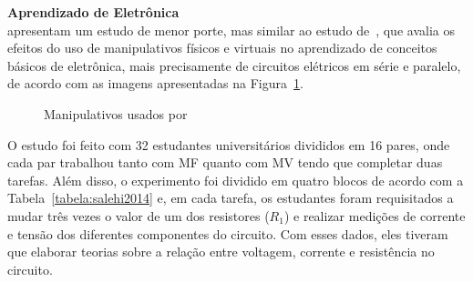 \textbf{Aprendizado de Eletrônica}\\
\cite{Salehi:2014} apresentam um estudo de menor porte, mas similar ao estudo de~\cite{zacharia:2011}, que avalia os efeitos do uso de manipulativos físicos e virtuais no aprendizado de conceitos básicos de eletrônica, mais precisamente de circuitos elétricos em série e paralelo, de acordo com as imagens apresentadas na Figura~\ref{fig:salehi2014}.



\begin{figure}[htb]
	\center
	\qquad
	\caption{Manipulativos usados por \cite{Salehi:2014}}
	\label{fig:salehi2014}
\end{figure}

O estudo foi feito com 32 estudantes universitários divididos em 16 pares, onde cada par trabalhou tanto com MF quanto com MV tendo que completar duas tarefas. Além disso, o experimento foi dividido em quatro blocos de acordo com a Tabela~\ref{tabela:salehi2014} e, em cada tarefa, os estudantes foram requisitados a mudar três vezes o valor de um dos resistores ($R_1$) e realizar medições de corrente e tensão dos diferentes componentes do circuito. Com esses dados, eles tiveram que elaborar teorias sobre a relação entre voltagem, corrente e resistência no circuito.
 
